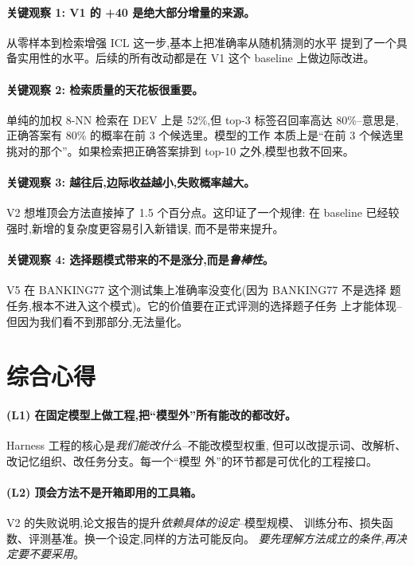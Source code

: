 \documentclass[10pt,twocolumn,letterpaper]{article}
\begin{document}
\paragraph{关键观察 1: V1 的 +40 是绝大部分增量的来源。}
从零样本到检索增强 ICL 这一步,基本上把准确率从随机猜测的水平
提到了一个具备实用性的水平。后续的所有改动都是在 V1 这个 baseline
上做边际改进。

\paragraph{关键观察 2: 检索质量的天花板很重要。}
单纯的加权 8-NN 检索在 DEV 上是 52\%,但 top-3 标签召回率高达
80\%--意思是,正确答案有 80\% 的概率在前 3 个候选里。模型的工作
本质上是``在前 3 个候选里挑对的那个''。如果检索把正确答案排到
top-10 之外,模型也救不回来。

\paragraph{关键观察 3: 越往后,边际收益越小,失败概率越大。}
V2 想堆顶会方法直接掉了 1.5 个百分点。这印证了一个规律:
在 baseline 已经较强时,新增的复杂度更容易引入新错误,
而不是带来提升。

\paragraph{关键观察 4: 选择题模式带来的不是涨分,而是\emph{鲁棒性}。}
V5 在 BANKING77 这个测试集上准确率没变化(因为 BANKING77 不是选择
题任务,根本不进入这个模式)。它的价值要在正式评测的选择题子任务
上才能体现--但因为我们看不到那部分,无法量化。

\section{综合心得}
\label{sec:lessons}

\paragraph{(L1) 在固定模型上做工程,把``模型外''所有能改的都改好。}
Harness 工程的核心是\emph{我们能改什么}--不能改模型权重,
但可以改提示词、改解析、改记忆组织、改任务分支。每一个``模型
外''的环节都是可优化的工程接口。

\paragraph{(L2) 顶会方法不是开箱即用的工具箱。}
V2 的失败说明,论文报告的提升\emph{依赖具体的设定}--模型规模、
训练分布、损失函数、评测基准。换一个设定,同样的方法可能反向。
\emph{要先理解方法成立的条件,再决定要不要采用}。
\end{document}
